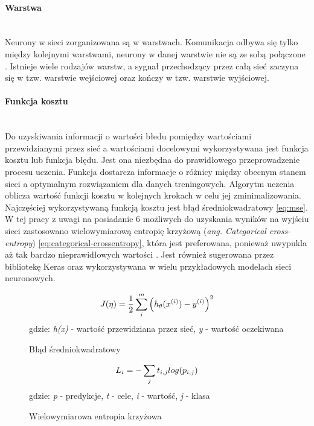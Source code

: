 \paragraph{Warstwa} \mbox{}\\
Neurony w sieci zorganizowana są w warstwach. Komunikacja odbywa się tylko między kolejnymi
warstwami, neurony w danej warstwie nie są ze sobą połączone \cite{CS231n, substBigConv}.
Istnieje wiele rodzajów warstw, a sygnał przechodzący przez całą sieć zaczyna się w tzw.
warstwie wejściowej oraz kończy w tzw. warstwie wyjściowej.

\paragraph{Funkcja kosztu} \mbox{}\\
Do uzyskiwania informacji o wartości błedu pomiędzy wartościami przewidzianymi przez sieć
a wartościami docelowymi wykorzystywana jest funkcja kosztu lub funkcja błędu.
Jest ona niezbędna do prawidłowego przeprowadzenie procesu uczenia.
Funkcja dostarcza informacje o różnicy między obecnym stanem sieci a optymalnym
rozwiązaniem dla danych treningowych. Algorytm uczenia
oblicza wartość funkcji kosztu w kolejnych krokach w celu jej zminimalizowania.\\
Najczęściej wykorzystywaną funkcją kosztu jest błąd średniokwadratowy \ref{eq:mse}.
W tej pracy z uwagi na posiadanie 6 możliwych do uzyskania wyników na wyjściu sieci
zastosowano wielowymiarową entropię krzyżową (\textit{ang. Categorical cross-entropy}) \ref{eq:categorical-crossentropy},
która jest preferowana, ponieważ uwypukla aż tak bardzo nieprawidłowych wartości \cite{whyNotMSE}. Jest również
sugerowana przez bibliotekę Keras oraz wykorzystywana w wielu przykładowych modelach sieci neuronowych.
\begin{figure}[h!]
\renewcommand{\figurename}{Wzór}%
\begin{equation} \label{eq:mse}
J(\eta) = \frac {1}{2} \sum_{i}^{m} \Big(h_{\theta}(x^{(i)}) - y^{(i)} \Big)^2\\
\end{equation}
\centering
gdzie: \textit{h\textsubscript{\straighttheta}(x)} - wartość przewidziana przez sieć, \textit{y} - wartość oczekiwana
\caption{Błąd średniokwadratowy}
\end{figure}
\begin{figure}[h!]
\renewcommand{\figurename}{Wzór}%
\begin{equation} \label{eq:categorical-crossentropy}
L_{i} = - \sum_{j} t_{i,j} log(p_{i,j})\\
\end{equation}
\centering
gdzie: \textit{p} - predykcje, \textit{t} - cele, \textit{i} - wartość, \textit{j} - klasa
\caption{Wielowymiarowa entropia krzyżowa}
\end{figure}


